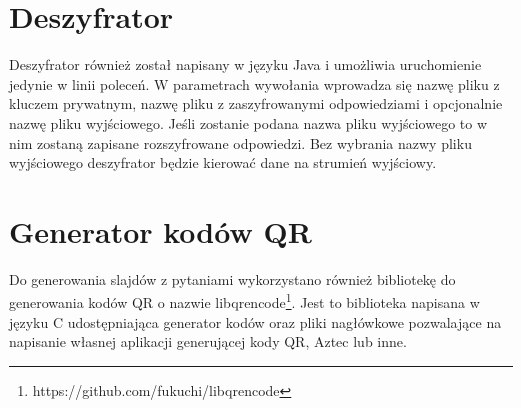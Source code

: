 \documentclass{report}
\begin{document}
		\section{Deszyfrator}
		
		Deszyfrator również został napisany w języku Java i umożliwia uruchomienie jedynie w linii poleceń. W parametrach wywołania wprowadza się nazwę pliku z kluczem prywatnym, nazwę pliku z zaszyfrowanymi odpowiedziami i opcjonalnie nazwę pliku wyjściowego. Jeśli zostanie podana nazwa pliku wyjściowego to w nim zostaną zapisane rozszyfrowane odpowiedzi. Bez wybrania nazwy pliku wyjściowego deszyfrator będzie kierować dane na strumień wyjściowy.
		
		\section{Generator kodów QR}
		
		Do generowania slajdów z pytaniami wykorzystano również bibliotekę do generowania kodów QR o nazwie libqrencode\footnote{https://github.com/fukuchi/libqrencode}. Jest to biblioteka napisana w języku C udostępniająca generator kodów oraz pliki nagłówkowe pozwalające na napisanie własnej aplikacji generującej kody QR, Aztec lub inne.
			
\end{document}
